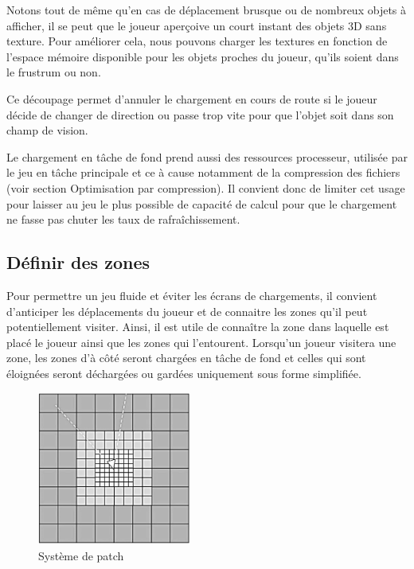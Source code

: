 \documentclass[a4paper, 12pt]{article} %
\begin{document}
Notons tout de même qu'en cas de déplacement brusque ou de nombreux objets à afficher, il se peut que le joueur aperçoive un court instant des objets 3D sans texture. Pour améliorer cela, nous pouvons charger les textures en fonction de l'espace mémoire disponible pour les objets proches du joueur, qu'ils soient dans le frustrum ou non.

Ce découpage permet d'annuler le chargement en cours de route si le joueur décide de changer de direction ou passe trop vite pour que l'objet soit dans son champ de vision.

Le chargement en tâche de fond prend aussi des ressources processeur, utilisée par le jeu en tâche principale et ce à cause notamment de la compression des fichiers (voir section Optimisation par compression). Il convient donc de limiter cet usage pour laisser au jeu le plus possible de capacité de calcul pour que le chargement ne fasse pas chuter les taux de rafraîchissement.

\newpage
\subsection{Définir des zones}
Pour permettre un jeu fluide et éviter les écrans de chargements, il convient d'anticiper les déplacements du joueur et de connaitre les zones qu'il peut potentiellement visiter. Ainsi, il est utile de connaître la zone dans laquelle est placé le joueur ainsi que les zones qui l'entourent. Lorsqu'un joueur visitera une zone, les zones d'à côté seront chargées en tâche de fond et celles qui sont éloignées seront déchargées ou gardées uniquement sous forme simplifiée.

\begin{figure}
\begin{center}
\includegraphics[width=0.45\textwidth]{images/patch-system-three.png}
\end{center}
\caption{Système de patch}
\end{figure}
\end{document}
